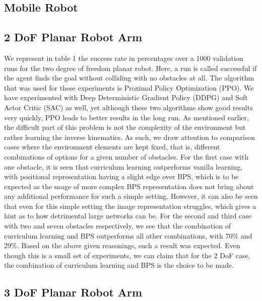 \documentclass[conference]{IEEEtran}
\begin{document}
\subsection{Mobile Robot}

\subsection{2 DoF Planar Robot Arm}

We represent in table 1 the success rate in percentages over a 1000 validation runs for the two degree of freedom planar robot. Here, a run is called successful if the agent finds the goal without colliding with no obstacles at all. The algorithm that was used for these experiments is Proximal Policy Optimization (PPO). We have experimented with Deep Deterministic Gradient Policy (DDPG) and Soft Actor Critic (SAC) as well, yet although these two algorithms show good results very quickly, PPO leads to better results in the long run. As mentioned earlier, the difficult part of this problem is not the complexity of the environment but rather learning the inverse kinematics. As such, we draw attention to comparison cases where the environment elements are kept fixed, that is, different combinations of options for a given number of obstacles. 
For the first case with one obstacle, it is seen that curriculum learning outperforms vanilla learning, with positional representation having a slight edge over BPS, which is to be expected as the usage of more complex BPS representation does not bring about any additional performance for such a simple setting. However, it can also be seen that even for this simple setting the image representation struggles, which gives a hint as to how detrimental large networks can be. 
For the second and third case with two and seven obstacles respectively, we see that the combination of curriculum learning and BPS outperforms all other combinations, with 70\% and 29\%. Based on the above given reasonings, such a result was expected. Even though this is a small set of experiments, we can claim that for the 2 DoF case, the combination of curriculum learning and BPS is the choice to be made. 


\subsection{3 DoF Planar Robot Arm}
\end{document}
